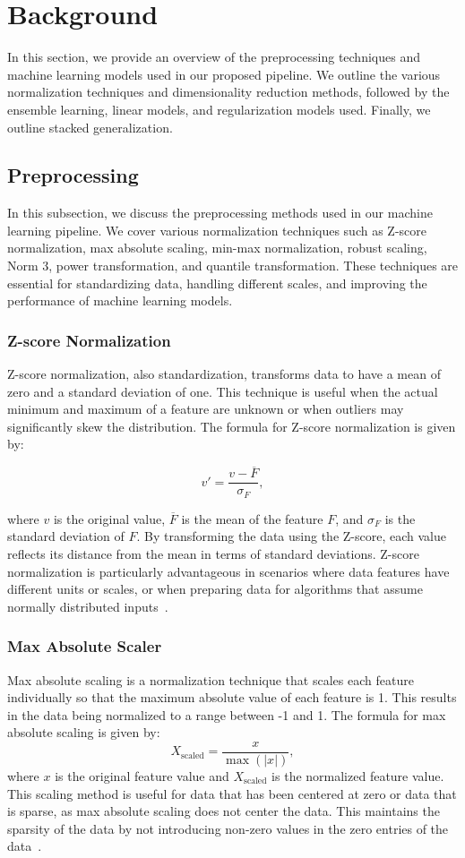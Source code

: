 \section{Background}\label{sec:background}
In this section, we provide an overview of the preprocessing techniques and machine learning models used in our proposed pipeline. 
We outline the various normalization techniques and dimensionality reduction methods, followed by the ensemble learning, linear models, and regularization models used.
Finally, we outline stacked generalization. 

\subsection{Preprocessing}
In this subsection, we discuss the preprocessing methods used in our machine learning pipeline.
We cover various normalization techniques such as Z-score normalization, max absolute scaling, min-max normalization, robust scaling, Norm 3, power transformation, and quantile transformation.
These techniques are essential for standardizing data, handling different scales, and improving the performance of machine learning models.

\subsubsection{Z-score Normalization}
Z-score normalization, also standardization, transforms data to have a mean of zero and a standard deviation of one.
This technique is useful when the actual minimum and maximum of a feature are unknown or when outliers may significantly skew the distribution.
The formula for Z-score normalization is given by:

$$
v' = \frac{v - \overline{F}}{\sigma_F},
$$

where $v$ is the original value, $\overline{F}$ is the mean of the feature $F$, and $\sigma_F$ is the standard deviation of $F$.
By transforming the data using the Z-score, each value reflects its distance from the mean in terms of standard deviations.
Z-score normalization is particularly advantageous in scenarios where data features have different units or scales, or when preparing data for algorithms that assume normally distributed inputs~\cite{dataminingConcepts}.

\subsubsection{Max Absolute Scaler}
Max absolute scaling is a normalization technique that scales each feature individually so that the maximum absolute value of each feature is 1.
This results in the data being normalized to a range between -1 and 1.
The formula for max absolute scaling is given by:
$$
	X_{\text{scaled}} = \frac{x}{\max(|x|)},
$$
where $x$ is the original feature value and $X_{\text{scaled}}$ is the normalized feature value.
This scaling method is useful for data that has been centered at zero or data that is sparse, as max absolute scaling does not center the data.
This maintains the sparsity of the data by not introducing non-zero values in the zero entries of the data~\cite{Vasques2024}.

